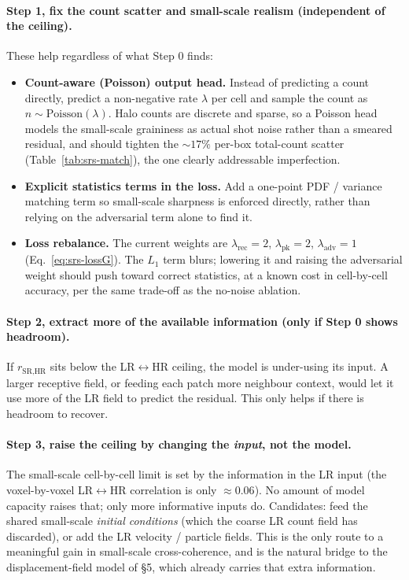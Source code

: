 \paragraph{Step 1, fix the count scatter and small-scale realism (independent
of the ceiling).} These help regardless of what Step 0 finds:
\begin{itemize}
  \item \textbf{Count-aware (Poisson) output head.} Instead of predicting a
  count directly, predict a non-negative rate $\lambda$ per cell and sample the
  count as $n\sim\mathrm{Poisson}(\lambda)$. Halo counts are discrete and sparse,
  so a Poisson head models the small-scale graininess as actual shot noise rather
  than a smeared residual, and should tighten the $\sim17\%$ per-box total-count
  scatter (Table~\ref{tab:srs-match}), the one clearly addressable imperfection.
  \item \textbf{Explicit statistics terms in the loss.} Add a one-point PDF /
  variance matching term so small-scale sharpness is enforced directly, rather
  than relying on the adversarial term alone to find it.
  \item \textbf{Loss rebalance.} The current weights are $\lambda_\text{rec}{=}2$,
  $\lambda_\text{pk}{=}2$, $\lambda_\text{adv}{=}1$
  (Eq.~\ref{eq:srs-lossG}). The $L_1$ term blurs; lowering it and raising the
  adversarial weight should push toward correct statistics, at a known cost in
  cell-by-cell accuracy, per the same trade-off as the no-noise ablation.
\end{itemize}

\paragraph{Step 2, extract more of the available information (only if Step 0
shows headroom).} If $r_\text{SR,HR}$ sits below the LR$\leftrightarrow$HR
ceiling, the model is under-using its input. A larger receptive field, or feeding
each patch more neighbour context, would let it use more of the LR field to
predict the residual. This only helps if there is headroom to recover.

\paragraph{Step 3, raise the ceiling by changing the \emph{input}, not the
model.} The small-scale cell-by-cell limit is set by the information in the LR
input (the voxel-by-voxel LR$\leftrightarrow$HR correlation is only
$\approx0.06$). No amount of model capacity raises that; only more informative
inputs do. Candidates: feed the shared small-scale \emph{initial conditions}
(which the coarse LR count field has discarded), or add the LR velocity / particle
fields. This is the only route to a meaningful gain in small-scale cross-coherence,
and is the natural bridge to the displacement-field model of \S5, which already
carries that extra information.

